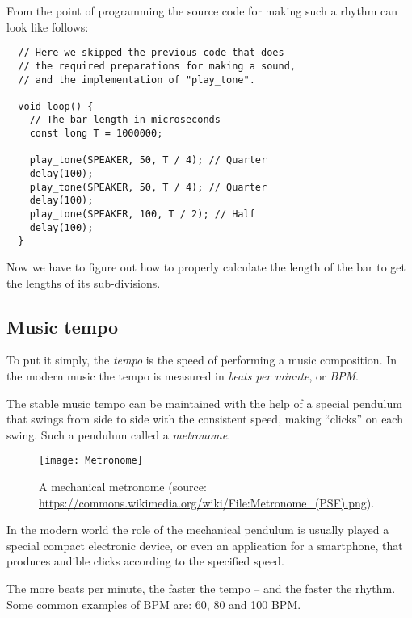 \documentclass[../sparc.tex]{subfiles}
\begin{document}
From the point of programming the source code for making such a rhythm can look
like follows:

\begin{verbatim}
  // Here we skipped the previous code that does
  // the required preparations for making a sound,
  // and the implementation of "play_tone".

  void loop() {
    // The bar length in microseconds
    const long T = 1000000;

    play_tone(SPEAKER, 50, T / 4); // Quarter
    delay(100);
    play_tone(SPEAKER, 50, T / 4); // Quarter
    delay(100);
    play_tone(SPEAKER, 100, T / 2); // Half
    delay(100);
  }
\end{verbatim}

Now we have to figure out how to properly calculate the length of the bar to get
the lengths of its sub-divisions.

\subsection{Music tempo}

To put it simply, the \emph{tempo} is the speed of performing a music
composition.  In the modern music the tempo is measured in \emph{beats per
minute}, or \emph{BPM}.

The stable music tempo can be maintained with the help of a special pendulum
that swings from side to side with the consistent speed, making ``clicks'' on
each swing.  Such a pendulum called a \emph{metronome}.

\begin{figure}[h]
  \centering
  \texttt{[image: Metronome]}
  \caption{A mechanical metronome (source:
    \url{https://commons.wikimedia.org/wiki/File:Metronome_(PSF).png}).}
  \label{fig:sound-metronome}
\end{figure}

In the modern world the role of the mechanical pendulum is usually played a
special compact electronic device, or even an application for a smartphone, that
produces audible clicks according to the specified speed.

The more beats per minute, the faster the tempo -- and the faster the rhythm.
Some common examples of \gls{BPM} are: 60, 80 and 100 BPM.
\end{document}
